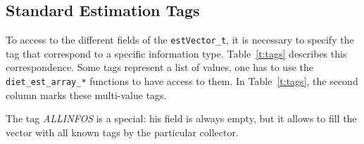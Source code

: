 \subsection{Standard Estimation Tags}\label{sect:estTags}

To access to the different fields of the \texttt{estVector\_t}, it is necessary
to specify the tag that correspond to a specific information type.
Table~\ref{t:tags} describes this correspondence. Some tags represent a list of
values, one has to use the \texttt{diet\_est\_array\_*} functions to have
access to them. In Table~\ref{t:tags},  the second column marks these
multi-value tags.

The tag \textit{ALLINFOS} is a special: his field is always empty, but it
allows to fill the vector with all known tags  by the particular collector.
 
